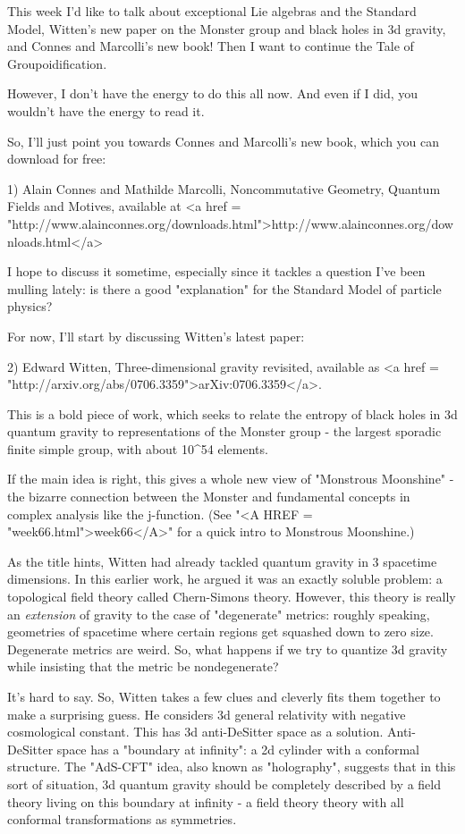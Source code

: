 


This week I'd like to talk about exceptional Lie algebras and the
Standard Model, Witten's new paper on the Monster group and black
holes in 3d gravity, and Connes and Marcolli's new book!  Then 
I want to continue the Tale of Groupoidification.

However, I don't have the energy to do this all now.  And even 
if I did, you wouldn't have the energy to read it.  

So, I'll just point you towards Connes and Marcolli's new book, 
which you can download for free:

1) Alain Connes and Mathilde Marcolli, Noncommutative Geometry,
Quantum Fields and Motives, available at 
<a href = "http://www.alainconnes.org/downloads.html">http://www.alainconnes.org/downloads.html</a>

I hope to discuss it sometime, especially since it tackles a 
question I've been mulling lately: is there a good "explanation" 
for the Standard Model of particle physics?   

For now, I'll start by discussing Witten's latest paper:

2) Edward Witten, Three-dimensional gravity revisited, available
as <a href = "http://arxiv.org/abs/0706.3359">arXiv:0706.3359</a>.

This is a bold piece of work, which seeks to relate the entropy of
black holes in 3d quantum gravity to representations of the 
Monster group - the largest sporadic finite simple group, with 
about 10^{54} elements.  

If the main idea is right, this gives a whole new view of
"Monstrous Moonshine" - the bizarre connection between the
Monster and fundamental concepts in complex analysis like the
j-function.  (See "<A HREF = "week66.html">week66</A>" for a
quick intro to Monstrous Moonshine.)

As the title hints, Witten had already tackled quantum gravity in 
3 spacetime dimensions.  In this earlier work, he argued it was an 
exactly soluble problem: a topological field theory called 
Chern-Simons theory.  However, this theory is really an 
\emph{extension} of gravity to the case of "degenerate" metrics: 
roughly speaking, geometries of spacetime where certain regions 
get squashed down to zero size.  Degenerate metrics are weird.  
So, what happens if we try to quantize 3d gravity while insisting 
that the metric be nondegenerate?

It's hard to say.  So, Witten takes a few clues and cleverly fits them
together to make a surprising guess.  He considers 3d general
relativity with negative cosmological constant.  This has 3d
anti-DeSitter space as a solution.  Anti-DeSitter space has a
"boundary at infinity": a 2d cylinder with a conformal
structure.  The "AdS-CFT" idea, also known as
"holography", suggests that in this sort of situation, 3d
quantum gravity should be completely described by a field theory
living on this boundary at infinity - a field theory theory with all
conformal transformations as symmetries.

